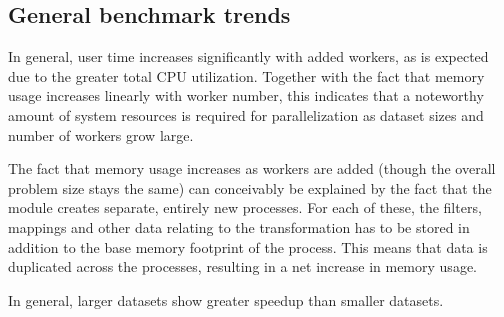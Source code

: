 
\subsection{General benchmark trends}
In general, user time increases significantly with added workers, as is expected due to the greater total CPU utilization. Together with the
fact that memory usage increases linearly with worker number, this indicates that a noteworthy amount of system resources is required 
for parallelization as dataset sizes and number of workers grow large.

The fact that memory usage increases as workers are added (though the overall problem size stays the same)
can conceivably be explained by the fact that the  module creates separate, entirely
new processes. For each of these, the filters, mappings and other data relating to the transformation has to be stored in addition to the
base memory footprint of the process. This means that data is duplicated across the processes, resulting in a net increase in memory usage.

In general, larger datasets show greater speedup than smaller datasets.


